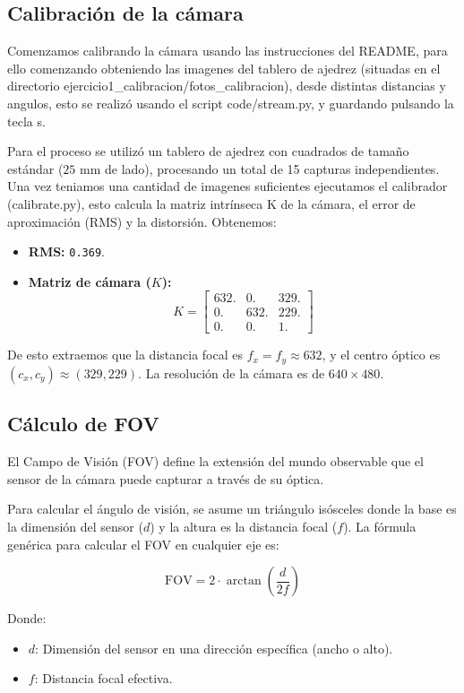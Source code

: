 \documentclass[12pt,a4paper]{article}
\begin{document}
\subsection{Calibración de la cámara}
Comenzamos calibrando la cámara usando las instrucciones del README, para ello comenzando obteniendo las imagenes del tablero de ajedrez (situadas en el directorio ejercicio1\_calibracion/fotos\_calibracion), desde distintas distancias y angulos, esto se realizó usando el script code/stream.py, y guardando pulsando la tecla s.

Para el proceso se utilizó un tablero de ajedrez con cuadrados de tamaño estándar ($25\text{ mm}$ de lado), procesando un total de 15 capturas independientes. Una vez teniamos una cantidad de imagenes suficientes ejecutamos el calibrador (calibrate.py), esto calcula la matriz intrínseca K de la cámara, el error de aproximación (RMS) y la distorsión. Obtenemos: 
\begin{itemize}
    \item \textbf{RMS:} \texttt{0.369}.
    \item \textbf{Matriz de cámara ($K$):}
    \[
    K = \begin{bmatrix}
    632. & 0. & 329. \\
    0. & 632. & 229. \\
    0. & 0. & 1.
    \end{bmatrix}
    \]
\end{itemize}
 De esto extraemos que la distancia focal es $f_x = f_y \approx 632$, y el centro óptico es $(c_x, c_y) \approx (329, 229)$. La resolución de la cámara es de $640 \times 480$.

 \subsection{Cálculo de FOV}
 El Campo de Visión (FOV) define la extensión del mundo observable que el sensor de la cámara puede capturar a través de su óptica.

Para calcular el ángulo de visión, se asume un triángulo isósceles donde la base es la dimensión del sensor ($d$) y la altura es la distancia focal ($f$). La fórmula genérica para calcular el FOV en cualquier eje es:

\begin{equation}
\text{FOV} = 2 \cdot \arctan\left(\frac{d}{2f}\right)
\end{equation}

Donde:
\begin{itemize}
    \item \textbf{$d$}: Dimensión del sensor en una dirección específica (ancho o alto).
    \item \textbf{$f$}: Distancia focal efectiva.
\end{itemize}
\end{document}

